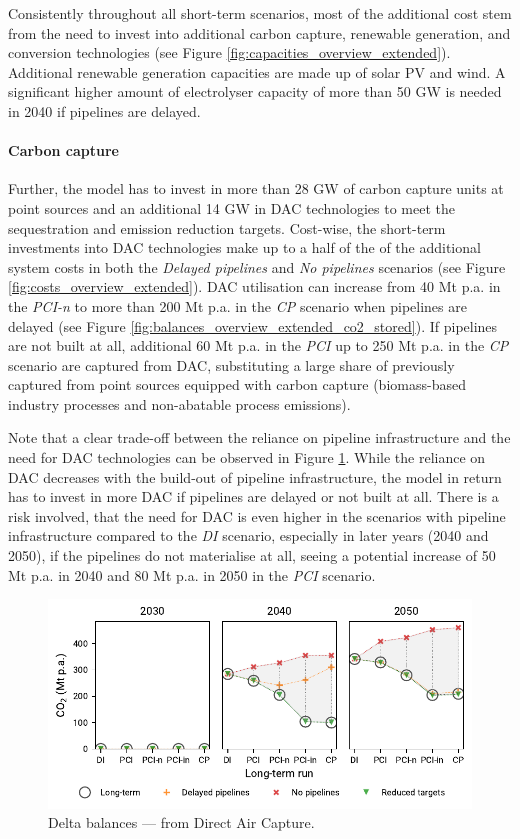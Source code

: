 \documentclass[preprint,12pt,sort&compress]{elsarticle}
\begin{document}
Consistently throughout all short-term scenarios, most of the additional cost stem from the need to invest into additional carbon capture, renewable generation, and conversion technologies (see Figure \ref{fig:capacities_overview_extended}). Additional renewable generation capacities are made up of solar PV and wind. A significant higher amount of electrolyser capacity of more than 50 GW is needed in 2040 if pipelines are delayed. 

\paragraph{Carbon capture}
Further, the model has to invest in more than 28 GW of carbon capture units at point sources and an additional 14 GW in DAC technologies to meet the sequestration and emission reduction targets. Cost-wise, the short-term investments into DAC technologies make up to a half of the of the additional system costs in both the \textit{Delayed pipelines} and \textit{No pipelines} scenarios (see Figure \ref{fig:costs_overview_extended}). DAC utilisation can increase from 40 Mt p.a. in the \textit{PCI-n} to more than 200 Mt p.a. in the \textit{CP} scenario when pipelines are delayed (see Figure \ref{fig:balances_overview_extended_co2_stored}). If pipelines are not built at all, additional 60 Mt p.a. in the \textit{PCI} up to 250 Mt p.a. in the \textit{CP} scenario are captured from DAC, substituting a large share of  previously captured from point sources equipped with carbon capture (biomass-based industry processes and non-abatable process emissions).

Note that a clear trade-off between the reliance on pipeline infrastructure and the need for DAC technologies can be observed in Figure \ref{fig:delta_balances_dac}. While the reliance on DAC decreases with the build-out of pipeline infrastructure, the model in return has to invest in more DAC if pipelines are delayed or not built at all. There is a risk involved, that the need for DAC is even higher in the scenarios with pipeline infrastructure compared to the \textit{DI} scenario, especially in later years (2040 and 2050), if the pipelines do not materialise at all, seeing a potential increase of 50 Mt p.a. in 2040 and 80 Mt p.a. in 2050 in the \textit{PCI} scenario.

\begin{figure}[htbp]
  \centering
  \includegraphics[width=\textwidth]{delta_balances_DAC}
  \caption{Delta balances ---  from Direct Air Capture.}
  \label{fig:delta_balances_dac}
\end{figure}
\end{document}
